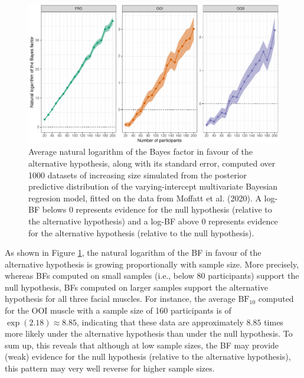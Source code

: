 \documentclass[
  english,
  man, donotrepeattitle,floatsintext]{apa6}
\begin{document}
\begin{figure}[!htb]

{\centering \includegraphics[width=1\linewidth]{manuscript_files/figure-latex/simulated-power-1} 

}

\caption{Average natural logarithm of the Bayes factor in favour of the alternative hypothesis, along with its standard error, computed over 1000 datasets of increasing size simulated from the posterior predictive distribution of the varying-intercept multivariate Bayesian regresion model, fitted on the data from Moffatt et al. (2020). A log-BF belows 0 represents evidence for the null hypothesis (relative to the alternative hypothesis) and a log-BF above 0 represents evidence for the alternative hypothesis (relative to the null hypothesis).}\label{fig:simulated-power}
\end{figure}

As shown in Figure \ref{fig:simulated-power}, the natural logarithm of the BF in favour of the alternative hypothesis is growing proportionally with sample size. More precisely, whereas BFs computed on small samples (i.e., below 80 participants) support the null hypothesis, BFs computed on larger samples support the alternative hypothesis for all three facial muscles. For instance, the average \(\text{BF}_{10}\) computed for the OOI muscle with a sample size of 160 participants is of \(\exp(2.18) \approx 8.85\), indicating that these data are approximately \(8.85\) times more likely under the alternative hypothesis than under the null hypothesis. To sum up, this reveals that although at low sample sizes, the BF may provide (weak) evidence for the null hypothesis (relative to the alternative hypothesis), this pattern may very well reverse for higher sample sizes.
\end{document}
